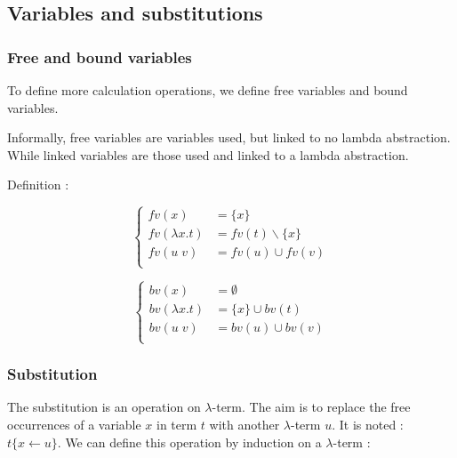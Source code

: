  \subsection{Variables and substitutions}

  \subsubsection{Free and bound variables}

  To define more calculation operations, we define free variables and bound
  variables.

  Informally, free variables are variables used, but linked to no lambda
  abstraction. While linked variables are those used and linked to a lambda
  abstraction.

  Definition :

  \begin{multicols}{2}
    \[
      \begin{cases}
        fv(x) &= \{x\} \\
        fv(\lambda x. t) &= fv(t)\backslash \{x\} \\
        fv(u\; v) &= fv(u) \cup fv(v) \\
      \end{cases}
    \]

    \[
      \begin{cases}
        bv(x) &= \emptyset \\
        bv(\lambda x. t) &= \{x\} \cup bv(t) \\
        bv(u\; v) &= bv(u) \cup bv(v) \\
      \end{cases}
    \]
  \end{multicols}

  \subsubsection{Substitution}

  The substitution is an operation on $\lambda$-term. The aim is to replace the
  free occurrences of a variable $x$ in term $t$ with another $\lambda$-term
  $u$. It is noted : $t\{x \leftarrow u\}$. We can define this operation by
  induction on a $\lambda$-term :

